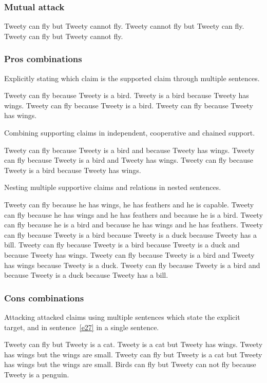 \subsubsection{Mutual attack}
\begin{exe}
\ex\label{e14} Tweety can fly but Tweety cannot fly. Tweety cannot fly but Tweety can fly.
\ex\label{e15} Tweety can fly but Tweety cannot fly.
\end{exe}

\subsubsection{Pros combinations}
Explicitly stating which claim is the supported claim through multiple sentences.
\begin{exe}
\ex\label{e16} Tweety can fly because Tweety is a bird. Tweety is a bird because Tweety has wings.
\ex\label{e17} Tweety can fly because Tweety is a bird. Tweety can fly because Tweety has wings.
\end{exe}

\noindent Combining supporting claims in independent, cooperative and chained support.
\begin{exe}
\ex\label{e18} Tweety can fly because Tweety is a bird and because Tweety has wings.
\ex\label{e19} Tweety can fly because Tweety is a bird and Tweety has wings.
\ex\label{e20} Tweety can fly because Tweety is a bird because Tweety has wings.
\end{exe}

\noindent Nesting multiple supportive claims and relations in nested sentences.
\begin{exe}
\ex\label{e21} Tweety can fly because he has wings, he has feathers and he is capable.
\ex\label{e130} Tweety can fly because he has wings and he has feathers and because he is a bird.
\ex\label{e131} Tweety can fly because he is a bird and because he has wings and he has feathers.
\ex\label{e22} Tweety can fly because Tweety is a bird because Tweety is a duck because Tweety has a bill.
\ex\label{e23} Tweety can fly because Tweety is a bird because Tweety is a duck and because Tweety has wings.
\ex\label{e24} Tweety can fly because Tweety is a bird and Tweety has wings because Tweety is a duck.
\ex\label{e25} Tweety can fly because Tweety is a bird and because Tweety is a duck because Tweety has a bill.
\end{exe}

\subsubsection{Cons combinations}
Attacking attacked claims using multiple sentences which state the explicit target, and in sentence~\ref{e27} in a single sentence. 
\begin{exe}
\ex\label{e26} Tweety can fly but Tweety is a cat. Tweety is a cat but Tweety has wings. Tweety has wings but the wings are small.
\ex\label{e27} Tweety can fly but Tweety is a cat but Tweety has wings but the wings are small.
\ex\label{e110} Birds can fly but Tweety can not fly because Tweety is a penguin.
\end{exe}

